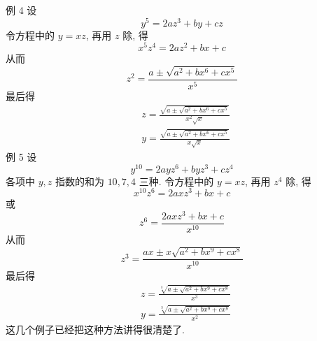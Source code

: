 例 4 设
\[
y^{5}=2 a z^{3}+b y+c z
\]
令方程中的 $y=x z$, 再用 $z$ 除, 得
\[
x^{5} z^{4}=2 a z^{2}+b x+c
\]
从而
\[
z^{2}=\frac{a \pm \sqrt{a^{2}+b x^{6}+c x^{5}}}{x^{5}}
\]
最后得
\[
\begin{aligned}
& z=\frac{\sqrt{a \pm \sqrt{a^{2}+b x^{6}+c x^{5}}}}{x^{2} \sqrt{x}} \\
& y=\frac{\sqrt{a \pm \sqrt{a^{2}+b x^{6}+c x^{5}}}}{x \sqrt{x}}
\end{aligned}
\]
例 5 设
\[
y^{10}=2 a y z^{6}+b y z^{3}+c z^{4}
\]
各项中 $y, z$ 指数的和为 $10,7,4$ 三种. 令方程中的 $y=x z$, 再用 $z^{4}$ 除, 得
\[
x^{10} z^{6}=2 a x z^{3}+b x+c
\]
或
\[
z^{6}=\frac{2 a x z^{3}+b x+c}{x^{10}}
\]
从而
\[
z^{3}=\frac{a x \pm x \sqrt{a^{2}+b x^{9}+c x^{8}}}{x^{10}}
\]
最后得
\[
\begin{aligned}
& z=\frac{\sqrt[3]{a \pm \sqrt{a^{2}+b x^{9}+c x^{8}}}}{x^{3}} \\
& y=\frac{\sqrt[3]{a \pm \sqrt{a^{2}+b x^{9}+c x^{8}}}}{x^{2}}
\end{aligned}
\]
这几个例子已经把这种方法讲得很清楚了. 

